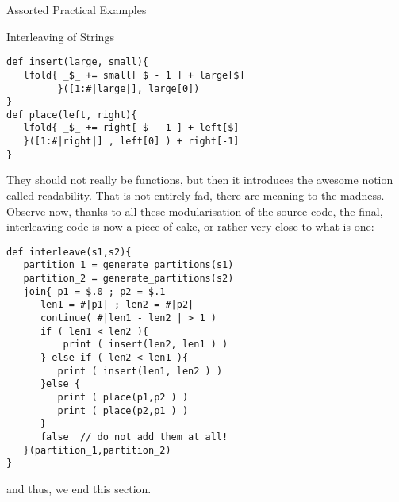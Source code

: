 \begin{section}{Assorted Practical Examples}
\begin{subsection}{Interleaving of Strings}
\begin{center}\begin{minipage}{\linewidth}
\begin{lstlisting}[style=JexlStyle]
def insert(large, small){
   lfold{ _$_ += small[ $ - 1 ] + large[$]
         }([1:#|large|], large[0])
}
def place(left, right){
   lfold{ _$_ += right[ $ - 1 ] + left[$]
   }([1:#|right|] , left[0] ) + right[-1]
}
\end{lstlisting}  
\end{minipage}\end{center}
They should not really be  functions, but then it introduces the awesome notion 
called \href{https://en.wikipedia.org/wiki/Computer\_programming\#Readability\_of\_source\_code}{readability}.
That is not entirely fad, there are meaning to the madness. Observe now, 
thanks to all these \href{https://en.wikipedia.org/wiki/Modular\_programming}{modularisation} of the source code,
the final, interleaving code is now a piece of cake, or rather very close to what is one:

\begin{center}\begin{minipage}{\linewidth}
\begin{lstlisting}[style=JexlStyle]
def interleave(s1,s2){
   partition_1 = generate_partitions(s1)
   partition_2 = generate_partitions(s2)
   join{ p1 = $.0 ; p2 = $.1 
      len1 = #|p1| ; len2 = #|p2|
      continue( #|len1 - len2 | > 1 )
      if ( len1 < len2 ){
          print ( insert(len2, len1 ) )
      } else if ( len2 < len1 ){
         print ( insert(len1, len2 ) )
      }else {
         print ( place(p1,p2 ) )
         print ( place(p2,p1 ) ) 
      }
      false  // do not add them at all!
   }(partition_1,partition_2)
}
\end{lstlisting}  
\end{minipage}\end{center}

and thus, we end this section.

\end{subsection}

\end{section}

